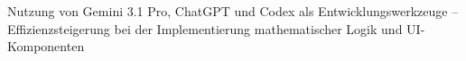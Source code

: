 
Nutzung von Gemini 3.1 Pro, ChatGPT und Codex als Entwicklungswerkzeuge – Effizienzsteigerung bei der Implementierung mathematischer Logik und UI-Komponenten
